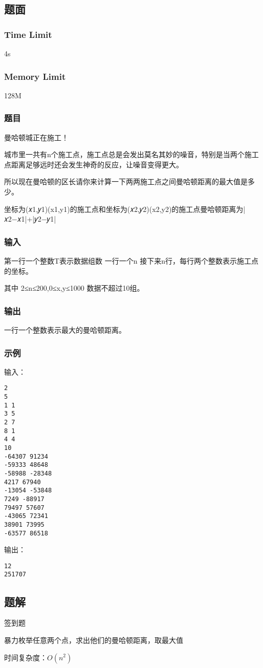 \subsection{题面}

\subsubsection{Time Limit}
4s

\subsubsection{Memory Limit}
128M

\subsubsection{题目}
曼哈顿城正在施工！

城市里一共有n个施工点，施工点总是会发出莫名其妙的噪音，特别是当两个施工点距离足够远时还会发生神奇的反应，让噪音变得更大。

所以现在曼哈顿的区长请你来计算一下两两施工点之间曼哈顿距离的最大值是多少。

坐标为(𝑥1,𝑦1)(x1,y1)的施工点和坐标为(𝑥2,𝑦2)(x2,y2)的施工点曼哈顿距离为|𝑥2−𝑥1|+|𝑦2−𝑦1|

\subsubsection{输入}
第一行一个整数T表示数据组数
一行一个n
接下来n行，每行两个整数表示施工点的坐标。

其中 2≤n≤200,0≤x,y≤1000 数据不超过10组。

\subsubsection{输出}
一行一个整数表示最大的曼哈顿距离。

\subsubsection{示例}
输入：
\begin{lstlisting}
2
5
1 1
3 5
2 7
8 1
4 4
10
-64307 91234
-59333 48648
-58988 -28348
4217 67940
-13054 -53848
7249 -88917
79497 57607
-43065 72341
38901 73995
-63577 86518
\end{lstlisting}

输出：
\begin{lstlisting}
12
251707
\end{lstlisting}

\subsection{题解}
签到题

暴力枚举任意两个点，求出他们的曼哈顿距离，取最大值

时间复杂度：$O(n^2)$

